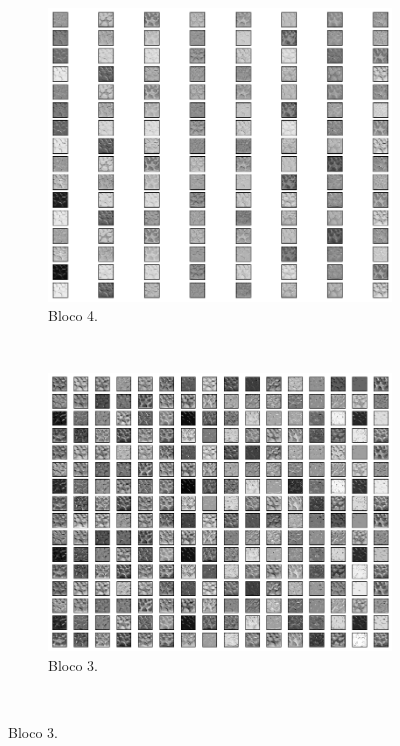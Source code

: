 \begin{figure}[H]
     \begin{subfigure}[t]{0.45\textwidth}
         \centering
         \includegraphics[width=1\linewidth]{recursos/imagens/results/bpca2.png}
         \caption{Bloco 4.}
         \label{results:fig:datasets:bpca.2}
     \end{subfigure}%
     ~ 
     \begin{subfigure}[t]{0.45\textwidth}
         \centering
         \includegraphics[width=1\linewidth]{recursos/imagens/results/bpca3.png}
         \caption{Bloco 3.}
         \label{results:fig:datasets:bpca.3}
     \end{subfigure}%
     ~ 
 

\end{figure}
